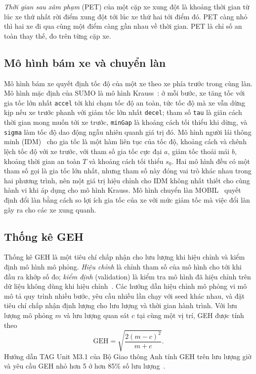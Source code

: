 \documentclass[../main.tex]{subfiles}
\begin{document}
\emph{Thời gian sau xâm phạm} (PET) của một cặp xe xung đột là khoảng thời gian từ lúc xe thứ nhất rời điểm xung đột tới lúc xe thứ hai tới điểm đó. PET càng nhỏ thì hai xe đi qua cùng một điểm càng gần nhau về thời gian. PET là chỉ số an toàn thay thế, đo trên từng cặp xe.

\subsection{Mô hình bám xe và chuyển làn}

Mô hình bám xe quyết định tốc độ của một xe theo xe phía trước trong cùng làn. Mô hình mặc định của SUMO là mô hình Krauss~\cite{krauss1998}: ở mỗi bước, xe tăng tốc với gia tốc lớn nhất \texttt{accel} tới khi chạm tốc độ an toàn, tức tốc độ mà xe vẫn dừng kịp nếu xe trước phanh với giảm tốc lớn nhất \texttt{decel}; tham số \texttt{tau} là giãn cách thời gian mong muốn tới xe trước, \texttt{minGap} là khoảng cách tối thiểu khi dừng, và \texttt{sigma} làm tốc độ dao động ngẫu nhiên quanh giá trị đó. Mô hình người lái thông minh (IDM)~\cite{treiber2000idm} cho gia tốc là một hàm liên tục của tốc độ, khoảng cách và chênh lệch tốc độ với xe trước, với tham số gia tốc cực đại $a$, giảm tốc thoải mái $b$, khoảng thời gian an toàn $T$ và khoảng cách tối thiểu $s_0$. Hai mô hình đều có một tham số gọi là gia tốc lớn nhất, nhưng tham số này đóng vai trò khác nhau trong hai phương trình, nên một giá trị hiệu chỉnh cho IDM không nhất thiết cho cùng hành vi khi áp dụng cho mô hình Krauss. Mô hình chuyển làn MOBIL~\cite{kesting2007mobil} quyết định đổi làn bằng cách so lợi ích gia tốc của xe với mức giảm tốc mà việc đổi làn gây ra cho các xe xung quanh.

\subsection{Thống kê GEH}

Thống kê GEH là một tiêu chí chấp nhận cho lưu lượng khi hiệu chỉnh và kiểm định mô hình mô phỏng. \emph{Hiệu chỉnh} là chỉnh tham số của mô hình cho tới khi đầu ra khớp số đo; \emph{kiểm định} (validation) là kiểm tra mô hình đã hiệu chỉnh trên dữ liệu không dùng khi hiệu chỉnh~\cite{hollander2008calibration}. Các hướng dẫn hiệu chỉnh mô phỏng vi mô~\cite{fhwa2004toolbox3,fhwa2019toolbox3} mô tả quy trình nhiều bước, yêu cầu nhiều lần chạy với seed khác nhau, và đặt tiêu chí chấp nhận định lượng cho lưu lượng và thời gian hành trình. Với lưu lượng mô phỏng $m$ và lưu lượng quan sát $c$ tại cùng một vị trí, GEH được tính theo
\begin{equation}
\mathrm{GEH} = \sqrt{\frac{2(m-c)^2}{m+c}}.
\label{eq:geh}
\end{equation}
Hướng dẫn TAG Unit M3.1 của Bộ Giao thông Anh tính GEH trên lưu lượng giờ và yêu cầu GEH nhỏ hơn 5 ở hơn 85\% số lưu lượng~\cite{dft2026tagm31}.
\end{document}
